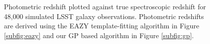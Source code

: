 \documentclass[useAMS,usenatbib,tightenlines,11pt,preprint]{aastex}
\begin{document}
\begin{figure}
\caption{
Photometric redshift plotted
against true spectroscopic redshift for 48,000 simulated LSST galaxy
observations.  Photometric redshifts are derived using the
EAZY template-fitting
algorithm in Figure \ref{subfig:eazy} and
our GP based algorithm in Figure \ref{subfig:gp}.
}
\label{fig:scatter}
\end{figure}
\end{document}
